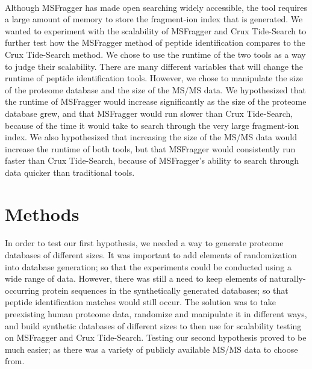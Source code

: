 \documentclass [11pt] {article}
\begin{document}
	\paragraph {}
	\qquad Although MSFragger has made open searching widely accessible, the tool requires a large amount of memory to store the fragment-ion index that is generated.  We wanted to experiment with the scalability of MSFragger and Crux Tide-Search to further test how the MSFragger method of peptide identification compares to the Crux Tide-Search method.  We chose to use the runtime of the two tools as a way to judge their scalability.  There are many different variables that will change the runtime of peptide identification tools.  However, we chose to manipulate the size of the proteome database and the size of the MS/MS data.  We hypothesized that the runtime of MSFragger would increase significantly as the size of the proteome database grew, and that MSFragger would run slower than Crux Tide-Search, because of the time it would take to search through the very large fragment-ion index.  We also hypothesized that increasing the size of the MS/MS data would increase the runtime of both tools, but that MSFragger would consistently run faster than Crux Tide-Search, because of MSFragger's ability to search through data quicker than traditional tools.
	
	
	\section {Methods}
	
	\paragraph {}
	\qquad In order to test our first hypothesis, we needed a way to generate proteome databases of different sizes.  It was important to add elements of randomization into database generation; so that the experiments could be conducted using a wide range of data.  However, there was still a need to keep elements of naturally-occurring protein sequences in the synthetically generated databases; so that peptide identification matches would still occur.  The solution was to take preexisting human proteome data, randomize and manipulate it in different ways, and build synthetic databases of different sizes to then use for scalability testing on MSFragger and Crux Tide-Search.  Testing our second hypothesis proved to be much easier; as there was a variety of publicly available MS/MS data to choose from.
		
\end{document}
